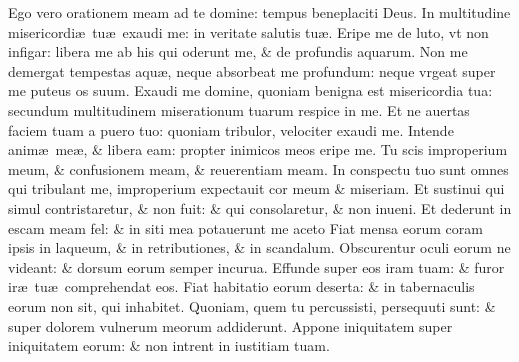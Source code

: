 \documentclass[a5paper,10pt]{book}
\def\ae{æ}
\begin{document}
\begin{multicols*}{2}
\newline \color{red} E\color{black}go vero orationem meam ad te domine: tempus beneplaciti Deus.
\newline \color{red} I\color{black}n multitudine misericordi\ae \ tu\ae \ exaudi me: in veritate salutis tu\ae .
\newline \color{red} E\color{black}ripe me de luto, vt non infigar: libera me ab his qui oderunt me, \& de profundis aquarum.
\newline \color{red} N\color{black}on me demergat tempestas aqu\ae , neque absorbeat me profundum: neque vrgeat super me puteus os suum.
\newline \color{red} E\color{black}xaudi me domine, quoniam benigna est misericordia tua: secundum multitudinem miserationum tuarum respice in me.
\newline \color{red} E\color{black}t ne auertas faciem tuam a puero tuo: quoniam tribulor, velociter exaudi me.
\newline \color{red} I\color{black}ntende anim\ae \ me\ae , \& libera eam: propter inimicos meos eripe me.
\newline \color{red} T\color{black}u scis improperium meum, \& confusionem meam, \& reuerentiam meam.
\newline \color{red} I\color{black}n conspectu tuo sunt omnes qui tribulant me, improperium expectauit cor meum \& miseriam.
\newline \color{red} E\color{black}t sustinui qui simul contristaretur, \& non fuit: \& qui consolaretur, \& non inueni.
\newline \color{red} E\color{black}t dederunt in escam meam fel: \& in siti mea potauerunt me aceto
\newline \color{red} F\color{black}iat mensa eorum coram ipsis in laqueum, \& in retributiones, \& in scandalum.
\newline \color{red} O\color{black}bscurentur oculi eorum ne videant: \& dorsum eorum semper incurua.
\newline \color{red} E\color{black}ffunde super eos iram tuam: \& furor ir\ae \ tu\ae \ comprehendat eos.
\newline \color{red} F\color{black}iat habitatio eorum deserta: \& in tabernaculis eorum non sit, qui inhabitet.
\newline \color{red} Q\color{black}uoniam, quem tu percussisti, persequuti sunt: \& super dolorem vulnerum meorum addiderunt.
\newline \color{red} A\color{black}ppone iniquitatem super iniquitatem eorum: \& non intrent in iustitiam tuam.

\end{multicols*}
\end{document}
